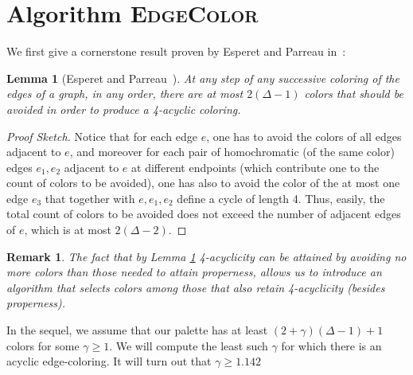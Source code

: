 \documentclass{amsart}
\theoremstyle{plain}
\newtheorem{lemma}{Lemma}
\newtheorem{remark}{Remark}
\newcommand{\K}{(2+\gamma)(\Delta-1)+1}
\newcommand{\EC}{\textsc{EdgeColor}}
\begin{document}
 

\section{Algorithm \EC}\label{sec:color}
%
We first  give  a cornerstone result proven by Esperet and Parreau in~\cite{DBLP:journals/ejc/EsperetP13}:
\begin{lemma}[Esperet and Parreau~\cite{DBLP:journals/ejc/EsperetP13}]\label{lem:sufficientcolors} At any step of any successive coloring of the edges of a graph, in any order, there are at most 
$2 (\Delta-1)$ colors that should be avoided in order to produce a 4-\nolinebreak acyclic coloring. 
\end{lemma}
%
\begin{proof}[Proof Sketch]
Notice that for each edge $e$, one has to avoid the colors of all edges  adjacent to $e$, and moreover  for each pair of homochromatic (of the same color) edges $e_1, e_2$  adjacent to $e$ at different endpoints (which contribute one to the count of colors to be avoided), one has also to avoid the color of the at most one edge $e_3$ that together with $e,e_1, e_2$ define a cycle of length 4. Thus, easily, the total count of colors to be avoided does not exceed the number of adjacent edges of $e$, which is at most $2(\Delta-2)$. \end{proof}
\begin{remark}\label{rmk:4-ac}
The fact that by Lemma \ref{lem:sufficientcolors} 
4-acyclicity can be attained
by avoiding  no more colors than those needed to attain properness, allows us to introduce  an algorithm that selects colors among those that also retain 4-acyclicity (besides properness). 
\end{remark}
In the sequel, we assume that our  palette has  at least $\K$ colors for some $\gamma \geq
1$. We will compute the least such $\gamma$ for which there is an acyclic
edge-coloring. It will turn out that $\gamma  \geq 1.142$




\end{document}
